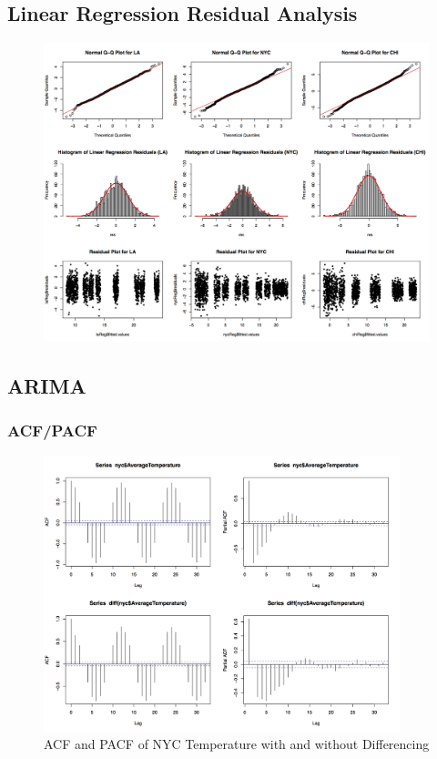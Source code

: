 \documentclass[12pt]{article}
\begin{document}
\subsection{Linear Regression Residual Analysis} \label{sec:lm}
\begin{figure}[H]
    \includegraphics[width=\textwidth]{Figures/reg.png}
\end{figure}


\subsection{ARIMA} 
\subsubsection{ACF/PACF} \label{arima}
\begin{figure}[H]
    \includegraphics[width=\textwidth, height=8cm]{Figures/nycACF.png}
    \caption{ACF and PACF of NYC Temperature with and without Differencing}
\end{figure}
\end{document}

